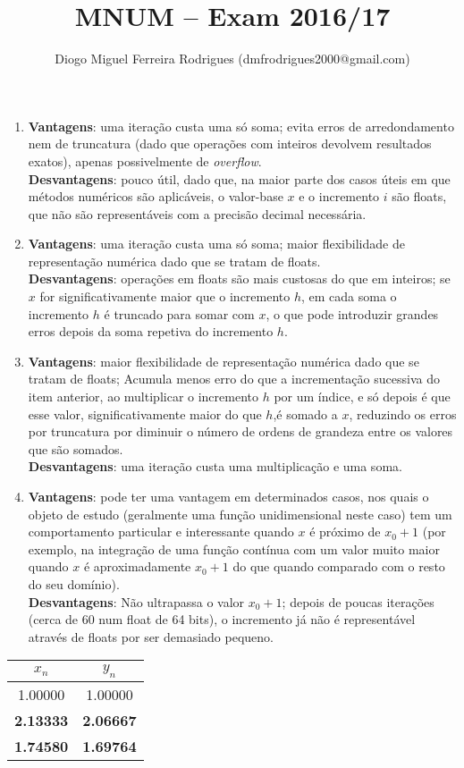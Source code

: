 \documentclass{mnum}
\title{MNUM -- Exam 2016/17}
\author{Diogo Miguel Ferreira Rodrigues (dmfrodrigues2000@gmail.com)}
\begin{document}
\setcounter{chapter}{15}

\begin{enumerate}
    \item
    \textbf{Vantagens}: uma iteração custa uma só soma; evita erros de arredondamento nem de truncatura (dado que operações com inteiros devolvem resultados exatos), apenas possivelmente de \textit{overflow}.\\
    \textbf{Desvantagens}: pouco útil, dado que, na maior parte dos casos úteis em que métodos numéricos são aplicáveis, o valor-base $x$ e o incremento $i$ são floats, que não são representáveis com a precisão decimal necessária.
    \item 
    \textbf{Vantagens}: uma iteração custa uma só soma; maior flexibilidade de representação numérica dado que se tratam de floats.\\
    \textbf{Desvantagens}: operações em floats são mais custosas do que em inteiros; se $x$ for significativamente maior que o incremento $h$, em cada soma o incremento $h$ é truncado para somar com $x$, o que pode introduzir grandes erros depois da soma repetiva do incremento $h$.
    \item
    \textbf{Vantagens}: maior flexibilidade de representação numérica dado que se tratam de floats; Acumula menos erro do que a incrementação sucessiva do item anterior, ao multiplicar o incremento $h$ por um índice, e só depois é que esse valor, significativamente maior do que $h$,é somado a $x$, reduzindo os erros por truncatura por diminuir o número de ordens de grandeza entre os valores que são somados.\\
    \textbf{Desvantagens}: uma iteração custa uma multiplicação e uma soma.
    \item
    \textbf{Vantagens}: pode ter uma vantagem em determinados casos, nos quais o objeto de estudo (geralmente uma função unidimensional neste caso) tem um comportamento particular e interessante quando $x$ é próximo de $x_0+1$ (por exemplo, na integração de uma função contínua com um valor muito maior quando $x$ é aproximadamente $x_0+1$ do que quando comparado com o resto do seu domínio).\\
    \textbf{Desvantagens}: Não ultrapassa o valor $x_0+1$; depois de poucas iterações (cerca de 60 num float de 64 bits), o incremento já não é representável através de floats por ser demasiado pequeno.
\end{enumerate}



\begin{center}
    \begin{tabular}{c | c}
        $x_n$ & $y_n$ \\ \hline
        1.00000 & 1.00000 \\
        \textbf{2.13333} & \textbf{2.06667} \\
        \textbf{1.74580} & \textbf{1.69764}
    \end{tabular}
\end{center}
\end{document}
